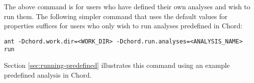 The above command is for users who have defined their own analyses and wish
to run them.  The following simpler command that uses the default values for
properties  suffices for users who only wish to run
analyses predefined in Chord:

\begin{framed}
\begin{verbatim}
ant -Dchord.work.dir=<WORK_DIR> -Dchord.run.analyses=<ANALYSIS_NAME> run
\end{verbatim}
\end{framed}

Section \ref{sec:running-predefined} illustrates this command using an example
predefined analysis in Chord.

